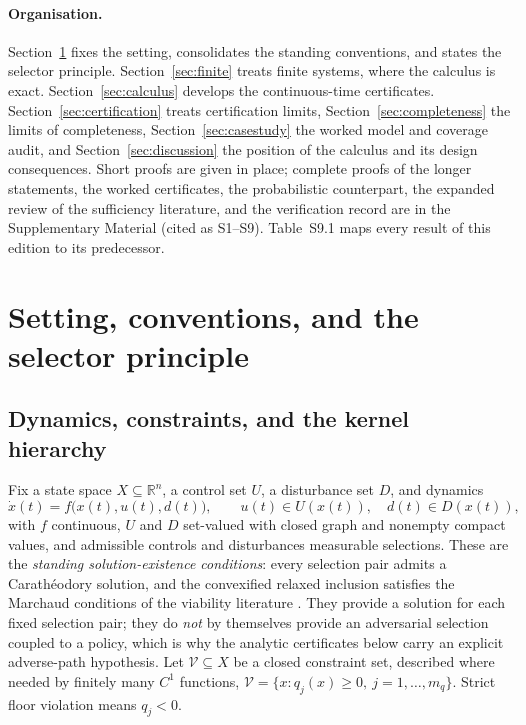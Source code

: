 \documentclass[11pt,a4paper]{article}
\theoremstyle{plain}
\theoremstyle{definition}
\theoremstyle{remark}
\newcommand{\R}{\mathbb{R}}
\newcommand{\cV}{\mathcal{V}}
\begin{document}
\paragraph{Organisation.} Section~\ref{sec:setting} fixes the setting, consolidates the standing conventions, and states the selector principle. Section~\ref{sec:finite} treats finite systems, where the calculus is exact. Section~\ref{sec:calculus} develops the continuous-time certificates. Section~\ref{sec:certification} treats certification limits, Section~\ref{sec:completeness} the limits of completeness, Section~\ref{sec:casestudy} the worked model and coverage audit, and Section~\ref{sec:discussion} the position of the calculus and its design consequences. Short proofs are given in place; complete proofs of the longer statements, the worked certificates, the probabilistic counterpart, the expanded review of the sufficiency literature, and the verification record are in the Supplementary Material (cited as S1--S9). Table~S9.1 maps every result of this edition to its predecessor.
\section{Setting, conventions, and the selector principle}\label{sec:setting}

\subsection{Dynamics, constraints, and the kernel hierarchy}\label{sec:kernels}

Fix a state space $X\subseteq\R^n$, a control set $U$, a disturbance set $D$, and dynamics
\begin{equation}\label{eq:dyn}
\dot x(t)=f\bigl(x(t),u(t),d(t)\bigr),\qquad u(t)\in U(x(t)),\quad d(t)\in D(x(t)),
\end{equation}
with $f$ continuous, $U$ and $D$ set-valued with closed graph and nonempty compact values, and admissible controls and disturbances measurable selections. These are the \emph{standing solution-existence conditions}: every selection pair admits a Carath\'eodory solution, and the convexified relaxed inclusion satisfies the Marchaud conditions of the viability literature \citep{aubin1991}. They provide a solution for each fixed selection pair; they do \emph{not} by themselves provide an adversarial selection coupled to a policy, which is why the analytic certificates below carry an explicit adverse-path hypothesis. Let $\cV\subseteq X$ be a closed constraint set, described where needed by finitely many $C^1$ functions, $\cV=\{x:q_j(x)\ge0,\ j=1,\dots,m_q\}$. Strict floor violation means $q_j<0$.
\end{document}
